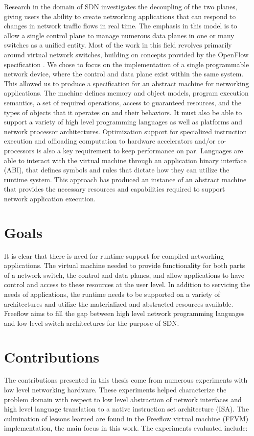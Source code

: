 Research in the domain of SDN investigates the
decoupling of the two planes, giving users the ability to create networking
applications that can respond to changes in network traffic flows in real time.
The emphasis in this model is to allow a single control plane to manage
numerous data planes in one or many switches as a unified entity. Most of the
work in this field revolves primarily around virtual network switches,
building on concepts provided by the OpenFlow specification \cite{openflow}.
We chose to focus on the implementation of a single programmable network
device, where the control and data plane exist within the same system. This
allowed us to produce a specification for an abstract machine for networking
applications. The machine defines memory and object models, program execution
semantics, a set of required operations, access to guaranteed resources, and
the types of objects that it operates on and their behaviors. It must also be
able to support a variety of high level programming languages as well as
platforms and network processor architectures. Optimization support for
specialized instruction execution and offloading computation to hardware
accelerators and/or co-processors is also a key requirement to keep
performance on par. Languages are able to interact with the virtual machine
through an application binary interface (ABI), that defines symbols and rules
that dictate how they can utilize the runtime system. This approach has
produced an instance of an abstract machine that provides the necessary
resources and capabilities required to support network application execution.


\section{Goals}
\label{intro:goals}
It is clear that there is need for runtime support for compiled
networking applications. The virtual machine needed to provide functionality
for both parts of a network switch, the control and data planes, and allow
applications to have control and access to these resources at the user level.
In addition to servicing the needs of applications, the runtime needs to be
supported on a variety of architectures and utilize the materialized and
abstracted resources available. Freeflow aims to fill the gap between high level
network programming languages and low level switch architectures for the purpose
of SDN.

\section{Contributions}
\label{intro:contrib}
The contributions presented in this thesis come from numerous experiments with
low level networking hardware. These experiments helped characterize the
problem domain with respect to low level abstraction of network interfaces and
high level language translation to a native instruction set architecture
(ISA). The culmination of lessons learned are found in the Freeflow virtual machine (FFVM) implementation, the main focus in this work. The experiments evaluated include:

